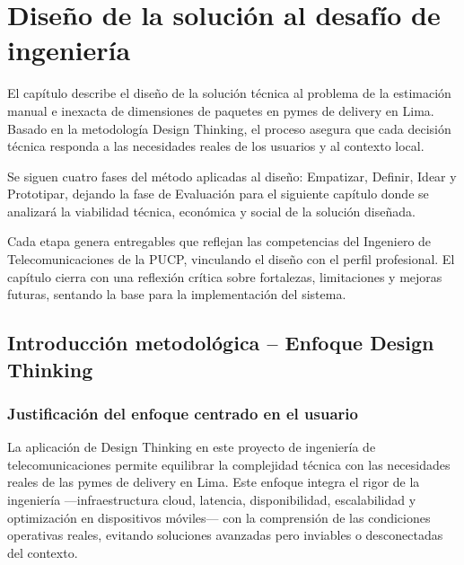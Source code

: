 
\chapter{Diseño de la solución al desafío de ingeniería}


El capítulo describe el diseño de la solución técnica al problema de la estimación manual e inexacta de dimensiones de paquetes en pymes de delivery en Lima. Basado en la metodología Design Thinking, el proceso asegura que cada decisión técnica responda a las necesidades reales de los usuarios y al contexto local.

Se siguen cuatro fases del método aplicadas al diseño: Empatizar, Definir, Idear y Prototipar, dejando la fase de Evaluación para el siguiente capítulo donde se analizará la viabilidad técnica, económica y social de la solución diseñada.

Cada etapa genera entregables que reflejan las competencias del Ingeniero de Telecomunicaciones de la PUCP, vinculando el diseño con el perfil profesional. El capítulo cierra con una reflexión crítica sobre fortalezas, limitaciones y mejoras futuras, sentando la base para la implementación del sistema.

\section{Introducción metodológica – Enfoque Design Thinking}

\subsection{Justificación del enfoque centrado en el usuario}

La aplicación de Design Thinking en este proyecto de ingeniería de telecomunicaciones permite equilibrar la complejidad técnica con las necesidades reales de las pymes de delivery en Lima. Este enfoque integra el rigor de la ingeniería —infraestructura cloud, latencia, disponibilidad, escalabilidad y optimización en dispositivos móviles— con la comprensión de las condiciones operativas reales, evitando soluciones avanzadas pero inviables o desconectadas del contexto. 

